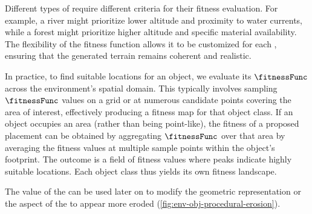 Different types of  require different criteria for their fitness evaluation. For example, a river might prioritize lower altitude and proximity to water currents, while a forest might prioritize higher altitude and specific material availability. The flexibility of the fitness function allows it to be customized for each , ensuring that the generated terrain remains coherent and realistic.


In practice, to find suitable locations for an object, we evaluate its $\fitnessFunc$ across the environment's spatial domain. This typically involves sampling $\fitnessFunc$ values on a grid or at numerous candidate points covering the area of interest, effectively producing a fitness map for that object class. If an object occupies an area (rather than being point-like), the fitness of a proposed placement can be obtained by aggregating $\fitnessFunc$ over that area by averaging the fitness values at multiple sample points within the object's footprint. The outcome is a field of fitness values where peaks indicate highly suitable locations. Each object class thus yields its own fitness landscape. 

The value of the  can be used later on to modify the geometric representation or the aspect of the  to appear more eroded (\cref{fig:env-obj-procedural-erosion}).










